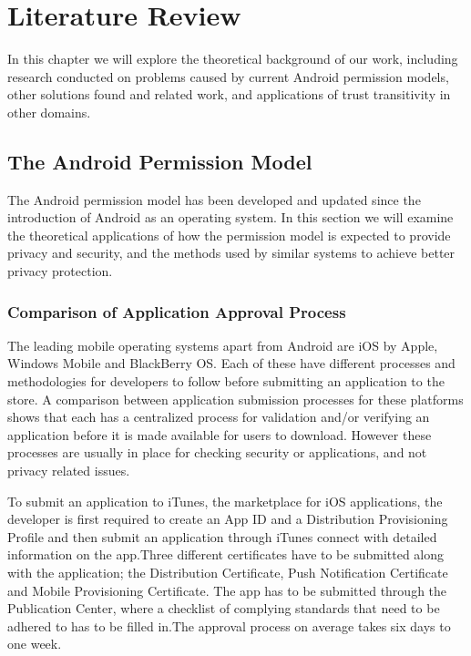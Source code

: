 \chapter{Literature Review} \label{cha:litrev}
In this chapter we will explore the theoretical background of our work, including research conducted on problems caused by current Android permission models, other solutions found and related work, and applications of trust transitivity in other domains.

\section{The Android Permission Model}
The Android permission model has been developed and updated since the introduction of Android as an operating system. In this section we will examine the theoretical applications of how the permission model is expected to provide privacy and security, and the methods used by similar systems to achieve better privacy protection.

\subsection{Comparison of Application Approval Process}

The leading mobile operating systems apart from Android are iOS by Apple, Windows Mobile and BlackBerry OS. Each of these have different processes and methodologies for developers to follow before submitting an application to the store. A comparison between application submission processes for these platforms shows that each has a centralized process for validation and/or verifying an application before it is made available for users to download. However these processes are usually in place for checking security or applications, and not privacy related issues. 
\smallskip

To submit an application to iTunes, the marketplace for iOS applications, the developer is first required to create an App ID and a Distribution Provisioning Profile and then  submit an application through iTunes connect with detailed information on the app.Three different certificates have to be submitted along with the application; the Distribution Certificate, Push Notification Certificate and Mobile Provisioning Certificate. The app has to be submitted through the Publication Center, where a checklist of complying standards that need to be adhered to has to be filled in.The approval process on average takes six days to one week.\cite{e}
\smallskip

